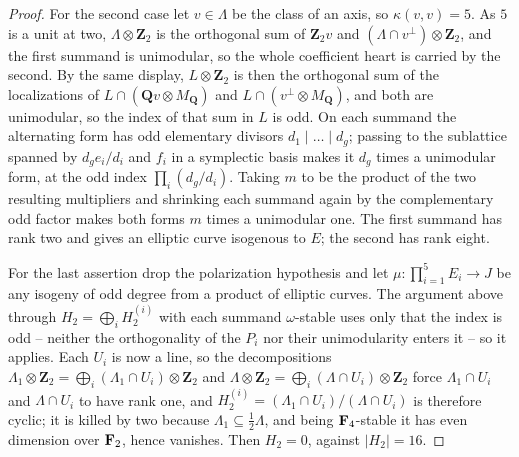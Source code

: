 \begin{proof}
For the second case let \(v\in\Lambda\) be the class of an axis, so
\(\kappa(v,v)=5\).  As \(5\) is a unit at two,
\(\Lambda\otimes\mathbf Z_2\) is the orthogonal sum of \(\mathbf Z_2v\) and
\((\Lambda\cap v^\perp)\otimes\mathbf Z_2\), and the first summand is
unimodular, so the whole coefficient heart is carried by the second.  By the
same display, \(L\otimes\mathbf Z_2\) is then the orthogonal sum of the
localizations of \(L\cap(\mathbf Qv\otimes M_{\mathbf Q})\) and
\(L\cap(v^\perp\otimes M_{\mathbf Q})\), and both are unimodular, so the index
of that sum in \(L\) is odd.  On each summand the alternating form has odd
elementary divisors \(d_1\mid\dots\mid d_g\); passing to the sublattice
spanned by \(d_ge_i/d_i\) and \(f_i\) in a symplectic basis makes it \(d_g\)
times a unimodular form, at the odd index \(\prod_i(d_g/d_i)\).  Taking
\(m\) to be the product of the two resulting multipliers and shrinking each
summand again by the complementary odd factor makes both forms \(m\) times a
unimodular one.  The first summand has rank two and gives an elliptic curve
isogenous to \(E\); the second has rank eight.

For the last assertion drop the polarization hypothesis and let
\(\mu:\prod_{i=1}^5E_i\to J\) be any isogeny of odd degree from a product of
elliptic curves.  The argument above through
\(H_2=\bigoplus_iH_2^{(i)}\) with each summand \(\omega\)-stable uses only
that the index is odd -- neither the orthogonality of the \(P_i\) nor their
unimodularity enters it -- so it applies.  Each \(U_i\) is now a line, so the
decompositions
\(\Lambda_1\otimes\mathbf Z_2=\bigoplus_i(\Lambda_1\cap U_i)\otimes\mathbf Z_2\)
and
\(\Lambda\otimes\mathbf Z_2=\bigoplus_i(\Lambda\cap U_i)\otimes\mathbf Z_2\)
force \(\Lambda_1\cap U_i\)
and \(\Lambda\cap U_i\) to have rank one, and
\(H_2^{(i)}=(\Lambda_1\cap U_i)/(\Lambda\cap U_i)\) is therefore cyclic; it is
killed by two because \(\Lambda_1\subseteq\tfrac12\Lambda\), and being
\(\mathbf F_4\)-stable it has even dimension over \(\mathbf F_2\), hence vanishes.
Then \(H_2=0\), against \(|H_2|=16\).
%
\end{proof}

